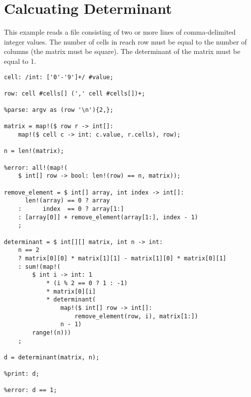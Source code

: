 
\section{Calcuating Determinant}
{

This example reads a file consisting of two or more lines of comma-delimited
integer values. The number of cells in reach row must be equal to the
number of columns (the matrix must be square).
The determinant of the matrix must be equal to 1.

\begin{lstlisting}[texcl=true, language=MAIA]
cell: /int: ['0'-'9']+/ #value;

row: cell #cells[] (',' cell #cells[])+;

%parse: argv as (row '\n'){2,};

matrix = map!($ row r -> int[]:
	map!($ cell c -> int: c.value, r.cells), row);

n = len!(matrix);

%error: all!(map!(
	$ int[] row -> bool: len!(row) == n, matrix));

remove_element = $ int[] array, int index -> int[]:
	  len!(array) == 0 ? array
	:      index  == 0 ? array[1:]
	: [array[0]] + remove_element(array[1:], index - 1)
	;

determinant = $ int[][] matrix, int n -> int:
	n == 2
	? matrix[0][0] * matrix[1][1] - matrix[1][0] * matrix[0][1]
	: sum!(map!(
		$ int i -> int: 1
			* (i % 2 == 0 ? 1 : -1)
			* matrix[0][i]
			* determinant(
				map!($ int[] row -> int[]: 
					remove_element(row, i), matrix[1:])
				n - 1)
		range!(n)))
	;

d = determinant(matrix, n);

%print: d;

%error: d == 1;
\end{lstlisting}
}














